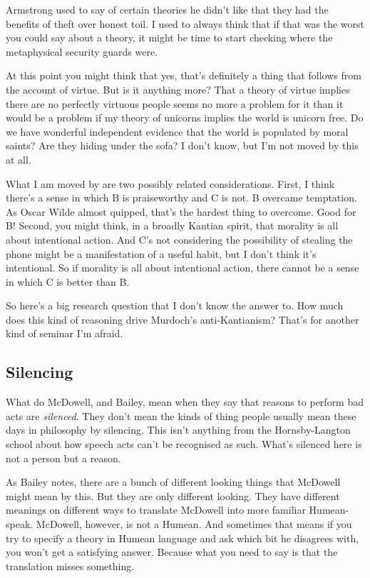 \documentclass[
]{article}
\begin{document}
Armstrong used to say of certain theories he didn't like that they had
the benefits of theft over honest toil. I used to always think that if
that was the worst you could say about a theory, it might be time to
start checking where the metaphysical security guards were.

At this point you might think that yes, that's definitely a thing that
follows from the account of virtue. But is it anything more? That a
theory of virtue implies there are no perfectly virtuous people seems no
more a problem for it than it would be a problem if my theory of
unicorns implies the world is unicorn free. Do we have wonderful
independent evidence that the world is populated by moral saints? Are
they hiding under the sofa? I don't know, but I'm not moved by this at
all.

What I am moved by are two possibly related considerations. First, I
think there's a sense in which B is praiseworthy and C is not. B
overcame temptation. As Oscar Wilde almost quipped, that's the hardest
thing to overcome. Good for B! Second, you might think, in a broadly
Kantian spirit, that morality is all about intentional action. And C's
not considering the possibility of stealing the phone might be a
manifestation of a useful habit, but I don't think it's intentional. So
if morality is all about intentional action, there cannot be a sense in
which C is better than B.

So here's a big research question that I don't know the answer to. How
much does this kind of reasoning drive Murdoch's anti-Kantianism? That's
for another kind of seminar I'm afraid.

\hypertarget{silencing}{%
\subsection{Silencing}\label{silencing}}

What do McDowell, and Bailey, mean when they say that reasons to perform
bad acts are \emph{silenced}. They don't mean the kinds of thing people
usually mean these days in philosophy by silencing. This isn't anything
from the Hornsby-Langton school about how speech acts can't be
recognised as such. What's silenced here is not a person but a reason.

As Bailey notes, there are a bunch of different looking things that
McDowell might mean by this. But they are only different looking. They
have different meanings on different ways to translate McDowell into
more familiar Humean-speak. McDowell, however, is not a Humean. And
sometimes that means if you try to specify a theory in Humean language
and ask which bit he disagrees with, you won't get a satisfying answer.
Because what you need to say is that the translation misses something.
\end{document}
